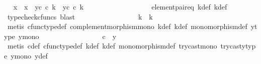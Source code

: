 \begin{isabellebody}
\ \isamarkupfalse%
\ {\isachardoublequoteopen}{\isacharparenleft}{\kern0pt}x{}\ {\isacharequal}{\kern0pt}\ x{}{\isacharparenright}{\kern0pt}\ {\isasymand}\ {\isacharparenleft}{\kern0pt}y{}\isactrlsup c\ {\isasymcirc}\isactrlsub c\ k{\isacharprime}{\kern0pt}\ {\isacharequal}{\kern0pt}\ y{}\isactrlsup c\ {\isasymcirc}\isactrlsub c\ k{\isacharparenright}{\kern0pt}{\isachardoublequoteclose}\isanewline
\ \ \ \ \ \ \ \ \ \ \ \ \ \ \ \ \isamarkupfalse%
\ \ element{\isacharunderscore}{\kern0pt}pair{\isacharunderscore}{\kern0pt}eq\ k{\isacharprime}{\kern0pt}{\isacharunderscore}{\kern0pt}def\ k{\isacharunderscore}{\kern0pt}def\ \isamarkupfalse%
\ {\isacharparenleft}{\kern0pt}typecheck{\isacharunderscore}{\kern0pt}cfuncs{\isacharcomma}{\kern0pt}\ blast{\isacharparenright}{\kern0pt}\isanewline
\ \ \ \ \ \ \ \ \ \ \ \ \ \ \isamarkupfalse%
\ \isamarkupfalse%
\ {\isachardoublequoteopen}k{\isacharprime}{\kern0pt}\ {\isacharequal}{\kern0pt}\ k{\isachardoublequoteclose}\isanewline
\ \ \ \ \ \ \ \ \ \ \ \ \ \ \ \ \isamarkupfalse%
\ {\isacharparenleft}{\kern0pt}metis\ cfunc{\isacharunderscore}{\kern0pt}type{\isacharunderscore}{\kern0pt}def\ complement{\isacharunderscore}{\kern0pt}morphism{\isacharunderscore}{\kern0pt}mono\ k{\isacharprime}{\kern0pt}{\isacharunderscore}{\kern0pt}def\ k{\isacharunderscore}{\kern0pt}def\ monomorphism{\isacharunderscore}{\kern0pt}def\ y{}{\isacharprime}{\kern0pt}{\isacharunderscore}{\kern0pt}type\ y{}{\isacharunderscore}{\kern0pt}mono{\isacharparenright}{\kern0pt}\isanewline
\ \ \ \ \ \ \ \ \ \ \ \ \ \ \isamarkupfalse%
\ \isamarkupfalse%
\ {\isachardoublequoteopen}c\ {\isacharequal}{\kern0pt}\ y{\isachardoublequoteclose}\isanewline
\ \ \ \ \ \ \ \ \ \ \ \ \ \ \ \ \isamarkupfalse%
\ {\isacharparenleft}{\kern0pt}metis\ c{\isacharunderscore}{\kern0pt}def\ cfunc{\isacharunderscore}{\kern0pt}type{\isacharunderscore}{\kern0pt}def\ k{\isacharprime}{\kern0pt}{\isacharunderscore}{\kern0pt}def\ k{\isacharunderscore}{\kern0pt}def\ monomorphism{\isacharunderscore}{\kern0pt}def\ try{\isacharunderscore}{\kern0pt}cast{\isacharunderscore}{\kern0pt}mono\ trycast{\isacharunderscore}{\kern0pt}y{}{\isacharunderscore}{\kern0pt}type\ y{}{\isacharunderscore}{\kern0pt}mono\ y{\isacharunderscore}{\kern0pt}def{\isacharparenright}{\kern0pt}\isanewline
\ \ \ \ \ \ \ \ \ \ \ \ \ \ \isamarkupfalse%
\ \isamarkupfalse%

\end{isabellebody}

